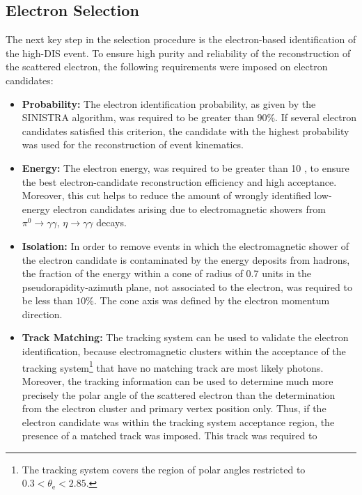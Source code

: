 \subsection{Electron Selection}
\label{subsec:eleselect}
The next key step in the selection procedure is the electron-based identification of the high-\qsq DIS event. To ensure high purity and reliability of the reconstruction of the scattered electron, the following requirements were imposed on electron candidates:
\begin{itemize}
	\item \textbf{Probability:} The electron identification probability, as given by the SINISTRA algorithm, was required to be greater than $90\%$. If several electron candidates satisfied this criterion, the candidate with the highest probability was used for the reconstruction of event kinematics.
	\item \textbf{Energy:} The electron energy, \eefin was required to be greater than 10 \GeV, to ensure the best electron-candidate reconstruction efficiency and high acceptance. Moreover, this cut helps to reduce the amount of wrongly identified low-energy electron candidates arising due to electromagnetic showers from $\pi^0\rightarrow\gamma\gamma,\, \eta\rightarrow\gamma\gamma$ decays.
	\item \textbf{Isolation:} In order to remove events in which the electromagnetic shower of the electron candidate is contaminated by the energy deposits from hadrons, the fraction of the energy within a cone of radius of 0.7 units in the pseudorapidity-azimuth plane, not associated to the electron, was required to be less than $10\%$. The cone axis was defined by the electron momentum direction.
	\item \textbf{Track Matching:} The tracking system can be used to validate the electron identification, because electromagnetic clusters within the acceptance of the tracking system\footnote{The tracking system covers the region of polar angles restricted to $0.3 < \theta_\text{e} < 2.85$.} that have no matching track are most likely photons. Moreover, the tracking information can be used to determine much more precisely the polar angle of the scattered electron than the determination from the electron cluster and primary vertex position only. Thus, if the electron candidate was within the tracking system acceptance region, the presence of a matched track was imposed. This track was required to 

\end{itemize}
